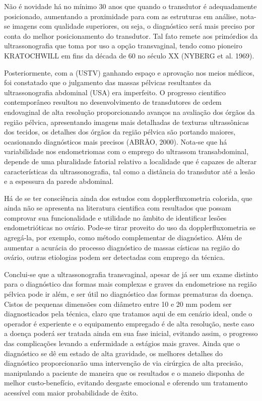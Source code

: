 \documentclass[12pt]{article} %
\begin{document}
Não é novidade há no mínimo 30 anos que quando o transdutor é adequadamente posicionado, aumentando a proximidade para com as estruturas em análise, nota-se imagens com qualidade superiores, ou seja, o diagnóstico será mais preciso por conta do melhor posicionamento do transdutor. Tal fato remete aos primórdios da ultrassonografia que toma por uso a opção transvaginal, tendo como pioneiro KRATOCHWILL em fins da década de 60 no século XX (NYBERG et al. 1969). 

Posteriormente, com a (USTV) ganhando espaço e aprovação nos meios médicos, foi constatado que o julgamento das massas pélvicas resultantes da ultrassonografia abdominal (USA) era imperfeito. O progresso cientifico contemporâneo resultou no desenvolvimento de transdutores de ordem endovaginal de alta resolução proporcionando avanços na avaliação dos órgãos da região pélvica, apresentando imagens mais detalhadas de texturas ultrassônicas dos tecidos, os detalhes dos órgãos da região pélvica são portando maiores, ocasionando diagnósticos mais precisos (ABRÃO, 2000). Nota-se que há variabilidade nos endometriomas com o emprego do ultrassom transabdominal, depende de uma pluralidade fatorial relativo a localidade que é capazes de alterar características da ultrassonografia, tal como a distância do transdutor até a lesão e a espessura da parede abdominal. 

Há de se ter consciência ainda dos estudos com dopplerfluxometria colorida, que ainda não se apresenta na literatura cientifica com resultados que possam comprovar sua
funcionalidade e utilidade no âmbito de identificar lesões endometrióticas no ovário. Pode-se tirar proveito do uso da dopplerfluxometria se agregá-la, por exemplo, como método complementar de diagnóstico. Além de aumentar a acurácia do processo diagnóstico de massas císticas na região do ovário, outras etiologias podem ser detectadas com emprego da técnica. 


Conclui-se que a ultrassonografia transvaginal, apesar de já ser um exame distinto para o diagnóstico das formas mais complexas e graves da endometriose na região pélvica pode ir além, e ser útil no diagnóstico das formas prematuras da doença. Cistos de pequenas dimensões com diâmetro entre 10 e 20 mm podem ser diagnosticados pela técnica, claro que tratamos aqui de em cenário ideal, onde o operador é experiente e o equipamento empregado é de alta resolução, neste caso a doença poderá ser tratada ainda em sua fase inicial, evitando assim, o progresso das complicações levando a enfermidade a estágios mais graves.  Ainda que o diagnóstico se dê em estado de alta gravidade, os melhores detalhes do diagnóstico proporcionarão uma intervenção de via cirúrgica de alta precisão, manipulando a paciente de maneira que os resultados e o maneio disponha de melhor custo-benefício, evitando desgaste emocional e oferendo um tratamento acessível com maior probabilidade de êxito.     
\end{document}
